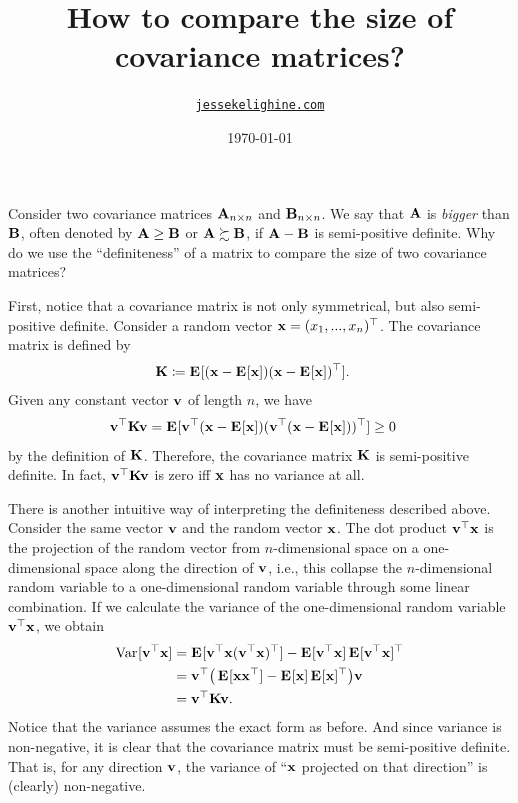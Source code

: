 \documentclass[a4paper]{article}
\title{How to compare the size of covariance matrices?}
\author{\href{https://jessekelighine.com}{\texttt{jessekelighine.com}}}
\date{\today}
\begin{document}
\maketitle

\begin{multicols}{2}

\noindent
Consider two covariance matrices $\AA_{n\times n}$ and $\BB_{n\times n}$.
We say that $\AA$ is \emph{bigger} than $\BB$,
often denoted by $\AA\geq \BB$ or $\AA\succsim \BB$, if $\AA-\BB$ is semi-positive definite.
Why do we use the ``definiteness'' of a matrix to compare the size of two covariance matrices?

First, notice that a covariance matrix is not only symmetrical, but also
semi-positive definite.  Consider a random vector $\xx=(x_1,...,x_n)\T$.
The covariance matrix is defined by
\begin{align*}
	\KK &\coloneqq \E{(\xx-\E{\xx})(\xx-\E{\xx})\T}.
\end{align*}
Given any constant vector $\vv$ of length $n$, we have
\begin{align*}
	\vv\T \KK \vv &= \E{\vv\T(\xx-\E{\xx})(\vv\T(\xx-\E{\xx}))\T} \geq 0
\end{align*}
by the definition of $\KK$.
Therefore, the covariance matrix $\KK$ is semi-positive definite.
In fact, $\vv\T\KK\vv$ is zero iff $\xx$ has no variance at all.

There is another intuitive way of interpreting the definiteness described above.
Consider the same vector $\vv$ and the random vector $\xx$.
The dot product $\vv\T \xx$ is the projection of the random vector from $n$-dimensional
space on a one-dimensional space along the direction of $\vv$, i.e.,
this collapse the $n$-dimensional random variable to a one-dimensional random variable through some linear combination.
If we calculate the variance of the one-dimensional random variable $\vv\T \xx$, we obtain
\begin{align*}
	\var{\vv\T \xx}
	&= \E{\vv\T \xx(\vv\T \xx)\T } - \E{\vv\T \xx}\E{\vv\T \xx}\T  \\
	&= \vv\T \big(\E{\xx\xx\T } - \E{\xx}\E{\xx}\T \big)\vv \\
	&= \vv\T \KK\vv.
\end{align*}
Notice that the variance assumes the exact form as before.
And since variance is non-negative, it is clear that the covariance matrix must be semi-positive definite.
That is, for any direction $\vv$,
the variance of ``$\xx$ projected on that direction'' is (clearly) non-negative.


\end{multicols}
\end{document}

